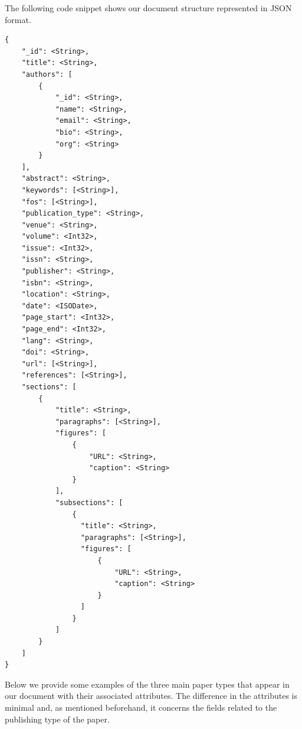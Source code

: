 The following code snippet shows our document structure represented in JSON format.
\begin{lstlisting}[label={lst:document_structure_mongodb}]
{
    "_id": <String>,
    "title": <String>,
    "authors": [
        {
            "_id": <String>,
            "name": <String>,
            "email": <String>,
            "bio": <String>,
            "org": <String>
        }
    ],
    "abstract": <String>,
    "keywords": [<String>],
    "fos": [<String>],
    "publication_type": <String>,
    "venue": <String>,
    "volume": <Int32>,
    "issue": <Int32>,
    "issn": <String>,
    "publisher": <String>,
    "isbn": <String>,
    "location": <String>,
    "date": <ISODate>,
    "page_start": <Int32>,
    "page_end": <Int32>,
    "lang": <String>,
    "doi": <String>,
    "url": [<String>],
    "references": [<String>],
    "sections": [
        {
            "title": <String>,
            "paragraphs": [<String>],
            "figures": [
                {
                    "URL": <String>,
                    "caption": <String>
                }
            ],
            "subsections": [
                {
                  "title": <String>,
                  "paragraphs": [<String>],
                  "figures": [
                      {
                          "URL": <String>,
                          "caption": <String>
                      }
                  ]
                }
            ]
        }
    ]
}
\end{lstlisting}
Below we provide some examples of the three main paper types that appear in our document with their associated attributes.
The difference in the attributes is minimal and, as mentioned beforehand, it concerns the fields related to the publishing type of the paper.

